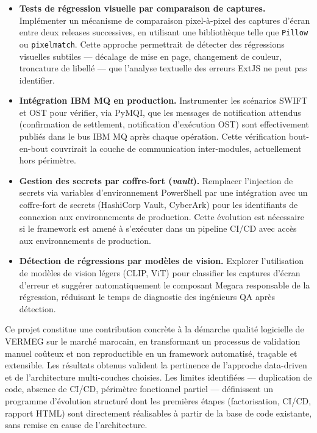 \documentclass[12pt, a4paper]{report}
\begin{document}
\begin{itemize}[itemsep=3pt]

  \item \textbf{Tests de régression visuelle par comparaison de captures.}
  Implémenter un mécanisme de comparaison pixel-à-pixel des captures d'écran entre deux releases successives, en utilisant une bibliothèque telle que \texttt{Pillow} ou \texttt{pixelmatch}. Cette approche permettrait de détecter des régressions visuelles subtiles — décalage de mise en page, changement de couleur, troncature de libellé — que l'analyse textuelle des erreurs ExtJS ne peut pas identifier.

  \item \textbf{Intégration IBM MQ en production.}
  Instrumenter les scénarios SWIFT et OST pour vérifier, via PyMQI, que les messages de notification attendus (confirmation de settlement, notification d'exécution OST) sont effectivement publiés dans le bus IBM MQ après chaque opération. Cette vérification bout-en-bout couvrirait la couche de communication inter-modules, actuellement hors périmètre.

  \item \textbf{Gestion des secrets par coffre-fort (\textit{vault}).}
  Remplacer l'injection de secrets via variables d'environnement PowerShell par une intégration avec un coffre-fort de secrets (HashiCorp Vault, CyberArk) pour les identifiants de connexion aux environnements de production. Cette évolution est nécessaire si le framework est amené à s'exécuter dans un pipeline CI/CD avec accès aux environnements de production.

  \item \textbf{Détection de régressions par modèles de vision.}
  Explorer l'utilisation de modèles de vision légers (CLIP, ViT) pour classifier les captures d'écran d'erreur et suggérer automatiquement le composant Megara responsable de la régression, réduisant le temps de diagnostic des ingénieurs QA après détection.

\end{itemize}

\bigskip

Ce projet constitue une contribution concrète à la démarche qualité logicielle de VERMEG sur le marché marocain, en transformant un processus de validation manuel coûteux et non reproductible en un framework automatisé, traçable et extensible. Les résultats obtenus valident la pertinence de l'approche data-driven et de l'architecture multi-couches choisies. Les limites identifiées — duplication de code, absence de CI/CD, périmètre fonctionnel partiel — définissent un programme d'évolution structuré dont les premières étapes (factorisation, CI/CD, rapport HTML) sont directement réalisables à partir de la base de code existante, sans remise en cause de l'architecture.
\end{document}
